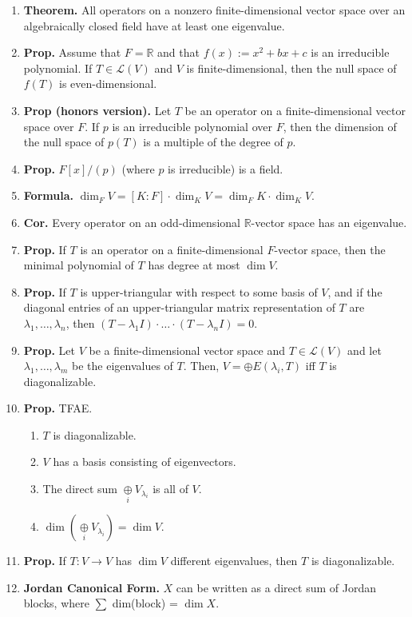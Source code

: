 \begin{enumerate}
	\item \textbf{Theorem. } All operators on a nonzero finite-dimensional vector space over an algebraically closed field have at least one eigenvalue. 
	\item \textbf{Prop. } Assume that $F = \mathbb{R}$ and that $f(x) := x^2 + bx + c$ is an irreducible polynomial. If $T \in \mathscr{L}(V)$ and $V$ is finite-dimensional, then the null space of $f(T)$ is even-dimensional. 
	\item \textbf{Prop (honors version). } Let $T$ be an operator on a finite-dimensional vector space over $F$. If $p$ is an irreducible polynomial over $F$, then the dimension of the null space of $p(T)$ is a multiple of the degree of $p$. 
	\item \textbf{Prop. } $F[x] / (p)$ (where $p$ is irreducible) is a field. 
	\item \textbf{Formula. } $\dim_F V = [K:F] \cdot \dim_K V = \dim_F K \cdot \dim_K V$. 
	\item \textbf{Cor. } Every operator on an odd-dimensional $\mathbb{R}$-vector space has an eigenvalue. 
	\item \textbf{Prop. } If $T$ is an operator on a finite-dimensional $F$-vector space, then the minimal polynomial of $T$ has degree at most $\dim V$. 
	\item \textbf{Prop. } If $T$ is upper-triangular with respect to some basis of $V$, and if the diagonal entries of an upper-triangular matrix representation of $T$ are $\lambda_1,\dots,\lambda_n$, then $(T-\lambda_1I) \cdot \dots \cdot (T-\lambda_nI)=0$. 
	\item \textbf{Prop. } Let $V$ be a finite-dimensional vector space and $T \in \mathscr{L}(V)$ and let $\lambda_1,\dots,\lambda_m$ be the eigenvalues of $T$. Then, $V = \oplus E(\lambda_i, T)$ iff $T$ is diagonalizable. 
	\item \textbf{Prop. } TFAE. 
	\begin{enumerate}
		\item $T$ is diagonalizable. 
		\item $V$ has a basis consisting of eigenvectors. 
		\item The direct sum $\underset{i}{\oplus} V_{\lambda_i}$ is all of $V$. 
		\item $\dim \left(\underset{i}{\oplus} V_{\lambda_i} \right) = \dim V$. 
	\end{enumerate}
	\item \textbf{Prop. } If $T: V \to V$ has $\dim V$ different eigenvalues, then $T$ is diagonalizable. 
	\item \textbf{Jordan Canonical Form. } $X$ can be written as a direct sum of Jordan blocks, where $\sum$ dim(block) = $\dim X$. 

\end{enumerate}
